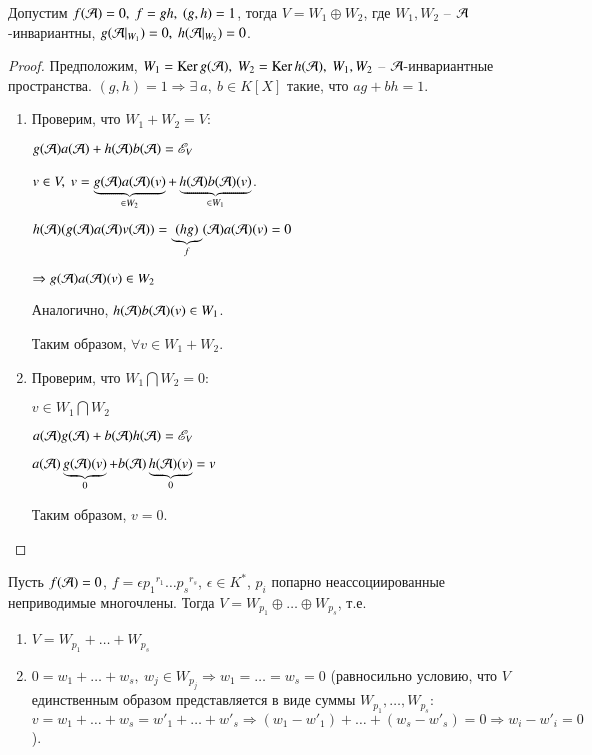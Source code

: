 \documentclass[main]{subfiles}
\begin{document}
\begin{proposition}
    Допустим $f(\mathcal{A}) = 0, \ f = gh, \ (g, h) = 1$, тогда $V = W_1 \oplus W_2$, где
    $W_1, W_2$ -- $\mathcal{A}$-инвариантны,  $g(\mathcal{A}|_{W_1}) = 0, \  h(\mathcal{A} |_{W_2}) = 0$.
\end{proposition}

\begin{proof}
    Предположим, $W_1 = \operatorname{Ker} g(\mathcal{A}), \ W_2 = \operatorname{Ker} h(\mathcal{A}), \
        W_1, W_2$ -- $\mathcal{A}$-инвариантные пространства.
    $(g, h) = 1 \Rightarrow \exists \ a, \ b \in K[X]$ такие, что $ag+bh = 1$.

    \begin{enumerate}
        \item Проверим, что $W_1 + W_2 = V$:
              \begin{center}
                  $g(\mathcal{A})a(\mathcal{A}) + h(\mathcal{A})b(\mathcal{A}) = \mathscr{E}_V$

                  $v \in V, \ v = \underbrace{g(\mathcal{A})a(\mathcal{A})(v)}_{\in W_2} + \underbrace{h(\mathcal{A})b(\mathcal{A})(v)}_{\in W_1}$.

                  $h(\mathcal{A})(g(\mathcal{A})a(\mathcal{A})v(\mathcal{A})) = \underbrace{(hg)}_{f}(\mathcal{A})a(\mathcal{A})(v) = 0 $

                  $\Rightarrow g(\mathcal{A})a(\mathcal{A})(v) \in W_2$
              \end{center}

              Аналогично, $h(\mathcal{A})b(\mathcal{A})(v) \in W_1$.

              Таким образом, $\forall v \in W_1 + W_2$.
        \item Проверим, что $W_1 \bigcap W_2 = 0$:
              \begin{center}
                  $v \in W_1 \bigcap W_2$

                  $a(\mathcal{A})g(\mathcal{A}) + b(\mathcal{A})h(\mathcal{A}) = \mathscr{E}_V$

                  $a(\mathcal{A})\underbrace{g(\mathcal{A})(v)}_{0} + b(\mathcal{A})\underbrace{h(\mathcal{A})(v)}_{0} = v$
              \end{center}
              Таким образом, $v = 0$.
    \end{enumerate}
\end{proof}


\begin{proposition}
    Пусть $f(\mathcal{A}) = 0$, $f = \epsilon {p_1}^{r_1} \ldots {p_s}^{r_s}$, $\epsilon \in K^*$,
    $p_i$ попарно неассоциированные неприводимые многочлены. Тогда $V = W_{p_1} \oplus \ldots \oplus W_{p_s}$, т.е.
    \begin{enumerate}
        \item $V = W_{p_1} + \ldots + W_{p_s}$
        \item $ 0 = w_1 + \ldots + w_s, \ w_j \in W_{p_j} \Rightarrow w_1 = \ldots = w_s = 0$ (равносильно условию, что $V$ единственным образом представляется в виде суммы $W_{p_1}, \ldots, W_{p_s}$: $v = w_1 + \ldots + w_s = w'_1 + \ldots + w'_s \Rightarrow (w_1 - w'_1) + \ldots + (w_s - w'_s) = 0 \Rightarrow w_i - w'_i = 0$).
    \end{enumerate}
\end{proposition}
\end{document}
